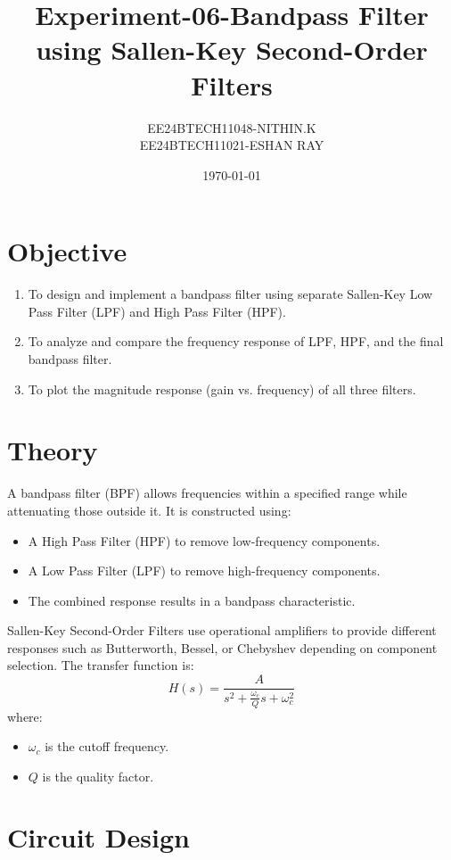 \documentclass[a4paper,12pt]{article}
\title{\textbf{Experiment-06-Bandpass Filter using Sallen-Key Second-Order Filters}}
\author{EE24BTECH11048-NITHIN.K\\ EE24BTECH11021-ESHAN RAY}
\date{\today}
\begin{document}
\maketitle

\section{Objective}
\begin{enumerate}
    \item To design and implement a bandpass filter using separate Sallen-Key Low Pass Filter (LPF) and High Pass Filter (HPF).
    \item To analyze and compare the frequency response of LPF, HPF, and the final bandpass filter.
    \item To plot the magnitude response (gain vs. frequency) of all three filters.
\end{enumerate}

\section{Theory}
A bandpass filter (BPF) allows frequencies within a specified range while attenuating those outside it. It is constructed using:
\begin{itemize}
    \item A High Pass Filter (HPF) to remove low-frequency components.
    \item A Low Pass Filter (LPF) to remove high-frequency components.
    \item The combined response results in a bandpass characteristic.
\end{itemize}

Sallen-Key Second-Order Filters use operational amplifiers to provide different responses such as Butterworth, Bessel, or Chebyshev depending on component selection. The transfer function is:
\begin{equation}
    H(s) = \frac{A}{s^2 + \frac{\omega_c}{Q}s + \omega_c^2}
\end{equation}
where:
\begin{itemize}
    \item $\omega_c$ is the cutoff frequency.
    \item $Q$ is the quality factor.
\end{itemize}

\section{Circuit Design}
\end{document}
